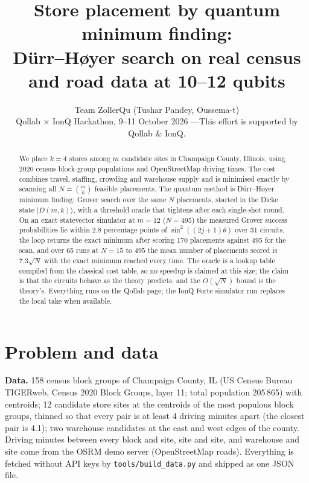 \documentclass[10pt,twocolumn]{article}
\title{\vspace{-1.1cm}\large\bfseries Store placement by quantum minimum finding:\\D\"urr--H{\o}yer search on real census and road data at 10--12 qubits}
\author{\normalsize Team ZollerQu (Tushar Pandey, Oussema-t)\\\small Qollab $\times$ IonQ Hackathon, 9--11 October 2026 \quad---\quad This effort is supported by Qollab \& IonQ.}
\date{}
\begin{document}
\maketitle
\vspace{-0.9cm}

\begin{abstract}\noindent
We place $k=4$ stores among $m$ candidate sites in Champaign County, Illinois, using 2020 census block-group populations and OpenStreetMap driving times. The cost combines travel, staffing, crowding and warehouse supply and is minimised exactly by scanning all $N=\binom{m}{k}$ feasible placements. The quantum method is D\"urr--H{\o}yer minimum finding: Grover search over the same $N$ placements, started in the Dicke state $|D(m,k)\rangle$, with a threshold oracle that tightens after each single-shot round. On an exact statevector simulator at $m=12$ ($N=495$) the measured Grover success probabilities lie within 2.8 percentage points of $\sin^2((2j+1)\theta)$ over 31 circuits, the loop returns the exact minimum after scoring 170 placements against 495 for the scan, and over 65 runs at $N=15$ to $495$ the mean number of placements scored is $7.3\sqrt N$ with the exact minimum reached every time. The oracle is a lookup table compiled from the classical cost table, so no speedup is claimed at this size; the claim is that the circuits behave as the theory predicts, and the $O(\sqrt N)$ bound is the theory's. Everything runs on the Qollab page; the IonQ Forte simulator run replaces the local take when available.
\end{abstract}

\section{Problem and data}
\textbf{Data.} 158 census block groups of Champaign County, IL (US Census Bureau TIGERweb, Census 2020 Block Groups, layer 11; total population 205\,865) with centroids; 12 candidate store sites at the centroids of the most populous block groups, thinned so that every pair is at least 4 driving minutes apart (the closest pair is 4.1); two warehouse candidates at the east and west edges of the county. Driving minutes between every block and site, site and site, and warehouse and site come from the OSRM demo server (OpenStreetMap roads). Everything is fetched without API keys by \texttt{tools/build\_data.py} and shipped as one JSON file.
\end{document}
